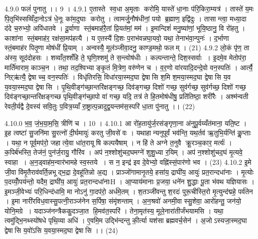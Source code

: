 4.9.0
फलं॑ पुनातु ।। 9 ।
4.9.1
ए॒तास्ते स्व॒धा अ॒मृताः करोमि॒ यास्ते॑ धा॒नाः प॑रि॒किरा॒म्यत्र॑ । तास्ते॑ य॒मः पि॒तृभि॑स्सव्विँदा॒नोऽत्र॑ धे॒नूः का॑म॒दुघाः करोतु । त्वामर्जु॒नौष॑धीनां॒ पयो ब्र॒ह्माण॒ इद्वि॑दुः । तासान्त्वा॒ मध्या॒दा द॑दे च॒रुभ्यो॒ अपि॑धातवे । दू॒र्वाणा स्तं॒बमाह॑रै॒तां प्रि॒यत॑मां॒ मम॑ । इ॒मान्दिशं॑ मनु॒ष्या॑णां॒ भूयि॒ष्ठानु॒ वि रो॑हतु । काशा॑ना स्तं॒बमाह॑र॒ रक्ष॑सा॒मप॑हत्यै । य ए॒तस्यै॑ दि॒शः प॒राभ॑वन्नघा॒यवो॒ यथा॒ तेनाभ॑वा॒न्पुनः॑ । द॒र्भाणा स्तं॒बमाह॑र पितृ॒णा मोष॑धीं प्रि॒याम् । अन्वस्यै॒ मूल॑ञ्जीवा॒दनु॒ काण्ड॒मथो॒ फलम् । (21)
4.9.2
लो॒कं पृ॑ण॒ ता अ॑स्य॒ सूद॑दोहसः । शव्वाँत॒श्शँहि ते॒ घृणि॒श्शमु॑ ते स॒न्त्वोष॑धीः । कल्पन्तान्ते॒ दिश॒स्सर्वाः । इ॒दमे॒व मेतोप॑रा॒ मार्ति॑माराम॒ काञ्च॒न । तथा॒ तद॒श्विभ्याङ्कृ॒तं मि॒त्रेण॒ वरु॑णेन च । व॒र॒णो वा॑रयादि॒दन्दे॒वो वन॒स्पतिः॑ । आर्त्यै॒ निऱ्ऋ॑त्यै॒ द्वेषाच्च॒ वन॒स्पतिः॑ । विधृ॑तिरसि॒ विधा॑रया॒स्मद॒घा द्वेषासि श॒मि श॒मया॒स्मद॒घा द्वेषासि य॒व य॒वया॒स्मद॒घा द्वेषासि । पृ॒थि॒वीङ्ग॑च्छा॒न्तरि॑क्षङ्गच्छ॒ दिव॑ङ्गच्छ॒ दिशो॑ गच्छ॒ सुव॑र्गच्छ॒ सुव॑र्गच्छ॒ दिशो॑ गच्छ॒ दिव॑ङ्गच्छा॒न्तरि॑क्षङ्गच्छ पृथि॒वीङ्ग॑च्छा॒पो वा॑ गच्छ॒ यदि॒ तत्र॑ ते हि॒तमोष॑धीषु॒ प्रति॑तिष्ठा॒ शरी॑रैः । अश्म॑न्वती रेवती॒र्यद्वै दे॒वस्य॑ सवि॒तुः प॒वित्र॒य्याँ रा॒ष्ट्रात्प॒न्नादुद्व॒यन्तम॑स॒स्परि॑ धा॒ता पु॑नातु ।। (22)
\anuvakamend

4.10.0
भ॒व॒ जं॒भ॒या॒म॒सि॒ त्रीणि॑ च । 10 ।
4.10.1
आ रो॑ह॒तायु॑र्ज॒रस॑ङ्गृणा॒ना अ॑नुपू॒र्वय्यँत॑माना॒ यति॒ष्ट । इ॒ह त्वष्टा॑ सु॒जनि॑मा सु॒रत्नो॑ दी॒र्घमायुः॑ करतु जी॒वसे॑ वः । यथाहान्यनुपूर्वं भव॑न्ति॒ यथ॒र्तव॑ ऋ॒तुभि॒र्यन्ति॑ कॢ॒प्ताः । यथा॒ न पूर्व॒मप॑रो॒ जहात्ये॒वा धा॑त॒रायूषि कल्पयैषाम् । न हि॑ ते अग्ने त॒नुवै क्रू॒रञ्च॒कार॒ मर्त्यः॑ । क॒पिर्ब॑भस्ति॒ तेज॑नं॒ पुन॑र्ज॒रायु॒ गौरि॑व । अप॑ न॒श्शोशु॑चद॒घमग्ने॑ शुशु॒ध्या र॒यिम् । अप॑ न॒श्शोशु॑चद॒घं मृ॒त्यवे॒ स्वाहा । अ॒न॒ड्वाह॑म॒न्वार॑भामहे स्व॒स्तये । स न॒ इन्द्र॑ इव दे॒वेभ्यो॒ वह्नि॑स्सं॒पार॑णो भव । (23)
4.10.2
इ॒मे जी॒वा वि॑मृ॒तैराव॑वर्ति॒न्नभूद्भ॒द्रा दे॒वहू॑तिन्नो अ॒द्य । प्राञ्जो॑गामानृ॒तये॒ हसा॑य॒ द्राघी॑य॒ आयुः॑ प्रत॒रान्दधा॑नाः । मृ॒त्योः प॒दय्योँ॒पय॑न्तो॒ यदैम॒ द्राघी॑य॒ आयुः॑ प्रत॒रान्दधा॑नाःH । आ॒प्याय॑मानाः प्र॒जया॒ धने॑न शु॒द्धाः पू॒ता भ॑वथ यज्ञियासः । इ॒मञ्जी॒वेभ्यः॑ परि॒धिन्द॑धामि॒ मा नोऽनु॑ गा॒दप॑रो॒ अर्ध॑मे॒तम् । श॒तञ्जी॑वन्तु श॒रदः॑ पुरू॒चीस्ति॒रो मृ॒त्युन्द॑द्महे॒ पर्व॑तेन । इ॒मा नारी॑रविध॒वास्सु॒पत्नी॒राञ्ज॑नेन स॒र्पिषा॒ संमृ॑शन्ताम् । अ॒न॒श्रवो॑ अनमी॒वा स्सु॒शेवा॒ आरो॑हन्तु॒ जन॑यो॒ योनि॒मग्रे । यदाञ्ज॑नन्त्रैककु॒दञ्जा॒त हि॒मव॑त॒स्परि॑ । तेना॒मृत॑स्य॒ मूले॒नारा॑तीर्जंभयामसि । यथा॒ त्वमु॑द्भि॒नथ्स्यो॑षधे पृथि॒व्या अधि॑ । ए॒वमि॒म उद्भि॑न्दन्तु की॒र्त्या यश॑सा ब्रह्मवर्च॒सेन॑ । अ॒जोऽस्यजा॒स्मद॒घा द्वेषासि य॒वो॑ऽसि य॒वया॒स्मद॒घा द्वेषासि ।। (24)
\anuvakamend

